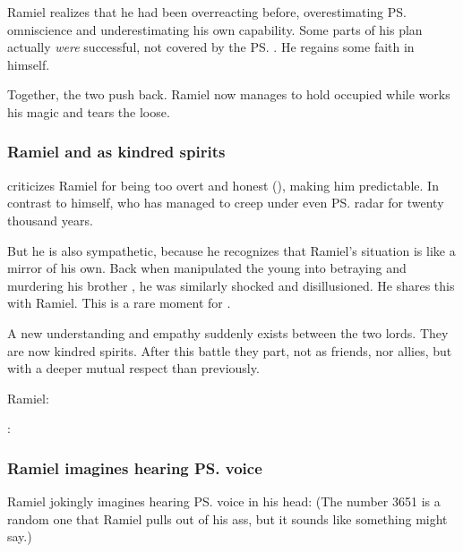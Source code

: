 Ramiel realizes that he had been overreacting before, overestimating \ps{\Daggerrain}{} omniscience and underestimating his own capability. 
Some parts of his plan actually \emph{were} successful, not covered by the \ps{\banelord}{} . 
He regains some faith in himself. 

Together, the two \satharioth{} push \Daggerrain{} back. 
Ramiel now manages to hold \Daggerrain{} occupied while \Azraid{} works his magic and tears the  loose. 





\subsubsection{Ramiel and \Azraid{} as kindred spirits}
\Azraid{} criticizes Ramiel for being too overt and honest (), making him predictable. 
In contrast to \Azraid{} himself, who has managed to creep under even \ps{\Daggerrain}{} radar for twenty thousand years. 

But he is also sympathetic, because he recognizes that Ramiel's situation is like a mirror of his own. 
Back when \Daggerrain{} manipulated the young \Azraid{} into betraying and murdering his brother \Damiarch, he was similarly shocked and disillusioned. 
He shares this with Ramiel. 
This is a rare  moment for \Azraid. 

A new understanding and empathy suddenly exists between the two \resphan{} lords. 
They are now kindred spirits. 
After this battle they part, not as friends, nor allies, but with a deeper mutual respect than previously. 

\begin{prose}
  Ramiel: 

  \Azraid: 
\end{prose}






\subsubsection{Ramiel imagines hearing \ps{\Daggerrain}{} voice}
Ramiel jokingly imagines hearing \ps{\Daggerrain}{} voice in his head: 
(The number 3651 is a random one that Ramiel pulls out of his ass, but it sounds like something \Daggerrain{} might say.)








